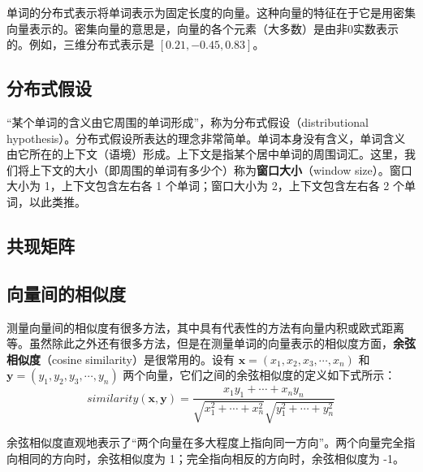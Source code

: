 单词的分布式表示将单词表示为固定长度的向量。这种向量的特征在于它是用密集向量表示的。密集向量的意思是，向量的各个元素（大多数）是由非0实数表示的。例如，三维分布式表示是 $[0.21,-0.45,0.83]$。
\subsection{分布式假设}
“某个单词的含义由它周围的单词形成”，称为分布式假设（distributional hypothesis）。分布式假设所表达的理念非常简单。单词本身没有含义，单词含义由它所在的上下文（语境）形成。上下文是指某个居中单词的周围词汇。这里，我们将上下文的大小（即周围的单词有多少个）称为\textbf{窗口大小}（window size）。窗口大小为 1，上下文包含左右各 1 个单词；窗口大小为 2，上下文包含左右各 2 个单词，以此类推。
\subsection{共现矩阵}

\subsection{向量间的相似度}
测量向量间的相似度有很多方法，其中具有代表性的方法有向量内积或欧式距离等。虽然除此之外还有很多方法，但是在测量单词的向量表示的相似度方面，\textbf{余弦相似度}（cosine similarity）是很常用的。设有 $\bm{x} = (x_1, x_2, x_3,\cdots , x_n)$ 和 $\bm{y} = (y_1, y_2, y_3,\cdots, y_n)$ 两个向量，它们之间的余弦相似度的定义如下式所示：
\begin{equation}
    similarity(\bm{x},\bm{y})=\frac{x_1y_1+\cdots+x_ny_n}{\sqrt{x_1^2+\cdots+x_n^2}\sqrt{y_1^2+\cdots+y_n^2}}
\end{equation}

余弦相似度直观地表示了“两个向量在多大程度上指向同一方向”。两个向量完全指向相同的方向时，余弦相似度为 1；完全指向相反的方向时，余弦相似度为 -1。